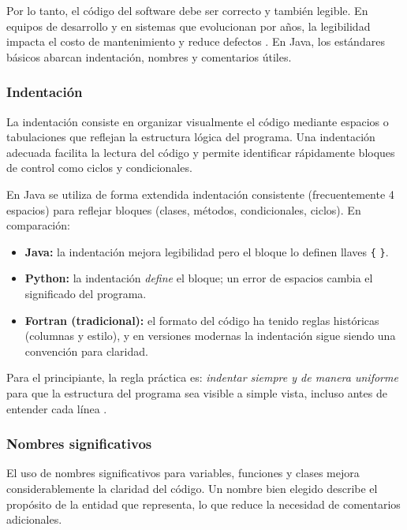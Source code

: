 \documentclass[12pt,twoside]{book}
\begin{document}
					Por lo tanto, el código del software debe ser correcto y también legible. En equipos de desarrollo y en sistemas que evolucionan por años, la legibilidad impacta el costo de mantenimiento y reduce defectos \cite{Martin2008Clean,McConnell2004Code,SWEBOK2025Guide}. En Java, los estándares básicos abarcan indentación, nombres y comentarios útiles.
					
					\subsubsection{Indentación}
						\noindent
						La indentación consiste en organizar visualmente el código mediante espacios o tabulaciones que reflejan la estructura lógica del programa. Una indentación adecuada facilita la lectura del código y permite identificar rápidamente bloques de control como ciclos y condicionales.
						
						En Java se utiliza de forma extendida indentación consistente (frecuentemente 4 espacios) para reflejar bloques (clases, métodos, condicionales, ciclos). En comparación:
						
						\begin{itemize}
							\item \textbf{Java:} la indentación mejora legibilidad pero el bloque lo definen llaves \texttt{\{} \texttt{\}}.
							\item \textbf{Python:} la indentación \emph{define} el bloque; un error de espacios cambia el significado del programa.
							\item \textbf{Fortran (tradicional):} el formato del código ha tenido reglas históricas (columnas y estilo), y en versiones modernas la indentación sigue siendo una convención para claridad.
						\end{itemize}
						
						\noindent
						Para el principiante, la regla práctica es: \emph{indentar siempre y de manera uniforme} para que la estructura del programa sea visible a simple vista, incluso antes de entender cada línea \cite{McConnell2004Code,Martin2008Clean}.
						
					\subsubsection{Nombres significativos}
						\noindent
						El uso de nombres significativos para variables, funciones y clases mejora considerablemente la claridad del código. Un nombre bien elegido describe el propósito de la entidad que representa, lo que reduce la necesidad de comentarios adicionales.
						
\end{document}
